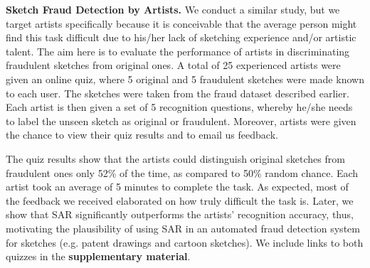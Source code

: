 

\noindent\textbf{Sketch Fraud Detection by Artists.} We conduct a similar study, but we target artists specifically because it is conceivable that the average person might find this task difficult due to his/her lack of sketching experience and/or artistic talent. The aim here is to evaluate the performance of artists in discriminating fraudulent sketches from original ones. A total of 25 experienced artists were given an online quiz, where 5 original and 5 fraudulent sketches were made known to each user. The sketches were taken from the fraud dataset described earlier. Each artist is then given a set of 5 recognition questions, whereby he/she needs to label the unseen sketch as original or fraudulent. Moreover, artists were given the chance to view their quiz results and to email us feedback. %

The quiz results show that the artists could distinguish original sketches from fraudulent ones only 52\% of the time, as compared to 50\% random chance. Each artist took an average of 5 minutes to complete the task. As expected, most of the feedback we received elaborated on how truly difficult the task is. Later, we show that SAR significantly outperforms the artists' recognition accuracy, thus, motivating the plausibility of using SAR in an automated fraud detection system for sketches (e.g. patent drawings and cartoon sketches). We include links to both quizzes in the \textbf{supplementary material}.
